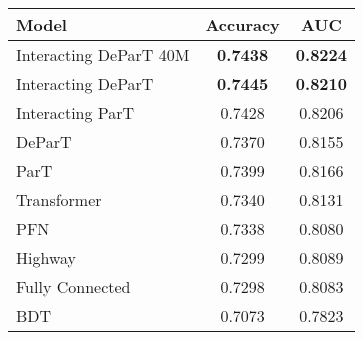 \begin{table}[!htb]
    \centering
    \caption{}
    \label{tab:results}
    \begin{tabular}{lcc}
    \toprule
        Model & Accuracy & AUC \\
    \midrule
        Interacting DeParT 40M & \textbf{0.7438} & \textbf{0.8224}\\
        Interacting DeParT & \textbf{0.7445} & \textbf{0.8210}\\
        Interacting ParT & 0.7428 & 0.8206 \\
        DeParT & 0.7370 & 0.8155 \\
        ParT & 0.7399 & 0.8166 \\
        Transformer & 0.7340 & 0.8131 \\
        PFN & 0.7338 & 0.8080 \\
        Highway & 0.7299 & 0.8089 \\
        Fully Connected & 0.7298 & 0.8083 \\
        BDT & 0.7073 & 0.7823 \\
    \bottomrule
    \end{tabular}
\end{table}
    